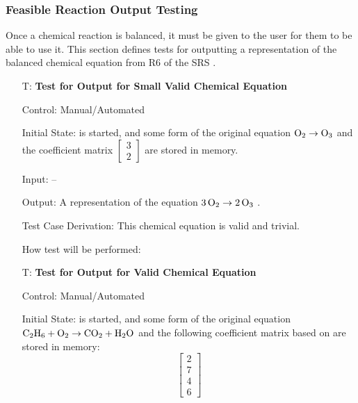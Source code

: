 \documentclass[12pt, titlepage]{article}
\newcounter{testnum} %
\begin{document}
\subsubsection{Feasible Reaction Output Testing}

Once a chemical reaction is balanced, it must be given to the user for them
to be able to use it. This section defines tests for outputting a
representation of the balanced chemical equation from
R6 of the SRS . 

\begin{enumerate}

  \item[T\refstepcounter{testnum}\thetestnum \label{test_small_valid_out}:]
    \textbf{Test for Output for Small Valid Chemical Equation}

    Control: Manual/Automated 

    Initial State: \progname{} is started, and some form of the original
    equation $\ce{O2} \rightarrow \ce{O3}$ and the coefficient matrix
    $\begin{bmatrix}
        3 \\
        2
      \end{bmatrix}$ are stored in memory.

    Input: --

    Output: A representation of the equation $\ce{3O2} \rightarrow \ce{2O3}$
    \cite[p.~6]{fahey_twenty_2011}.

    Test Case Derivation: This chemical equation is valid and trivial.

    How test will be performed: 

  \item[T\refstepcounter{testnum}\thetestnum \label{test_valid_out}:]
    \textbf{Test for Output for Valid Chemical Equation}

    Control: Manual/Automated 

    Initial State: \progname{} is started, and some form of the original
    equation $\ce{C2H6} + \ce{O2} \rightarrow \ce{CO2} + \ce{H2O}$
    \cite{hamid_balancing_2019} and the following coefficient matrix
    based on \cite{hamid_balancing_2019} are stored in memory:
    $$\begin{bmatrix}
        2 \\
        7 \\
        4 \\
        6
      \end{bmatrix}$$


\end{enumerate}
\end{document}
